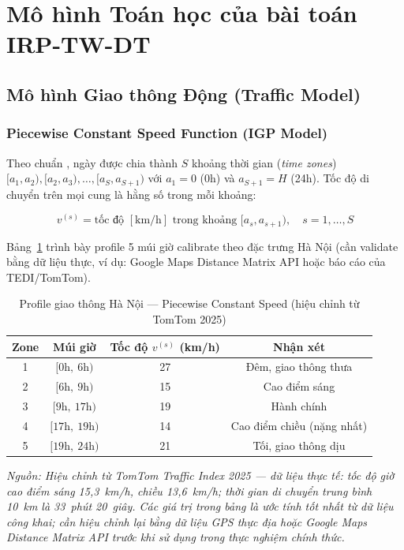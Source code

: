 \documentclass[12pt,a4paper]{article}
\begin{document}
\section{Mô hình Toán học của bài toán IRP-TW-DT}

\subsection{Mô hình Giao thông Động (Traffic Model)}

\subsubsection{Piecewise Constant Speed Function (IGP Model)}

Theo chuẩn \citep{ichoua2003vehicle, ghiani2014note}, ngày được chia thành $S$ khoảng
thời gian (\textit{time zones}) $[a_1, a_2), [a_2, a_3), \ldots, [a_S, a_{S+1})$ với
$a_1 = 0$ (0h) và $a_{S+1} = H$ (24h). Tốc độ di chuyển trên mọi cung là hằng số
trong mỗi khoảng:

\begin{equation}
  v^{(s)} = \text{tốc độ } [\text{km/h}] \text{ trong khoảng } [a_s, a_{s+1}),
  \quad s = 1, \ldots, S
\end{equation}

\noindent Bảng~\ref{tab:speed} trình bày profile 5 múi giờ calibrate theo đặc trưng
Hà Nội (cần validate bằng dữ liệu thực, ví dụ: Google Maps Distance Matrix API hoặc
báo cáo của TEDI/TomTom).

\begin{table}[htbp]
\centering
\caption{Profile giao thông Hà Nội --- Piecewise Constant Speed (hiệu chỉnh từ TomTom 2025)}
\label{tab:speed}
\renewcommand{\arraystretch}{1.2}
\begin{tabular}{@{}c c c c@{}}
\toprule
\textbf{Zone} & \textbf{Múi giờ} & \textbf{Tốc độ $v^{(s)}$ (km/h)} &
\textbf{Nhận xét} \\
\midrule
1 & $[0\text{h},\ 6\text{h})$    & 27 & Đêm, giao thông thưa \\
2 & $[6\text{h},\ 9\text{h})$    & 15 & Cao điểm sáng \\
3 & $[9\text{h},\ 17\text{h})$   & 19 & Hành chính \\
4 & $[17\text{h},\ 19\text{h})$  & 14 & Cao điểm chiều (nặng nhất) \\
5 & $[19\text{h},\ 24\text{h})$  & 21 & Tối, giao thông dịu \\
\bottomrule
\end{tabular}
\vspace{4pt}
\begin{minipage}{0.9\linewidth}
\small\textit{Nguồn: Hiệu chỉnh từ TomTom Traffic Index 2025 \citep{tomtom2025hanoi} ---
dữ liệu thực tế: tốc độ giờ cao điểm sáng 15,3~km/h, chiều 13,6~km/h; thời gian di chuyển
trung bình 10~km là 33~phút 20~giây. Các giá trị trong bảng là ước tính tốt nhất từ
dữ liệu công khai; cần hiệu chỉnh lại bằng dữ liệu GPS thực địa hoặc Google Maps
Distance Matrix API trước khi sử dụng trong thực nghiệm chính thức.}
\end{minipage}
\end{table}
\end{document}
